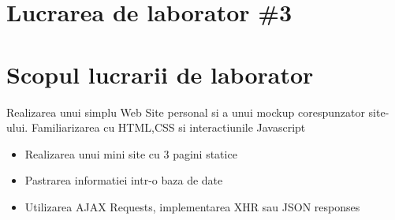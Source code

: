 \section*{Lucrarea de laborator \#3}

\section{Scopul lucrarii de laborator}
Realizarea unui simplu Web Site personal si a unui mockup corespunzator site-ului. Familiarizarea cu HTML,CSS si interactiunile Javascript

\begin{itemize}
	\item Realizarea unui mini site cu 3 pagini statice
	\item Pastrarea informatiei intr-o baza de date
	\item Utilizarea AJAX Requests, implementarea XHR sau JSON responses
\end{itemize}

\clearpage